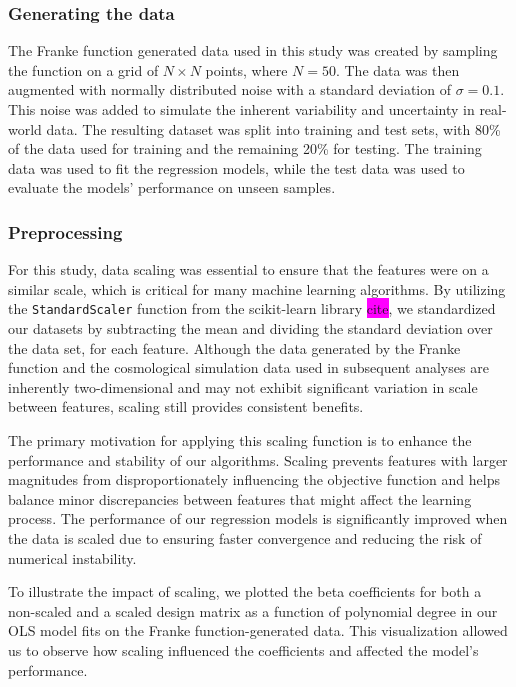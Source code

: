 \documentclass[aps,pra,english,notitlepage,reprint,nofootinbib]{revtex4-1}  %
\begin{document}
\subsubsection{Generating the data}
The Franke function generated data used in this study was created by sampling the function on a grid of $N\times N$ points, where $N=50$. The data was then augmented with normally distributed noise with a standard deviation of $\sigma=0.1$. This noise was added to simulate the inherent variability and uncertainty in real-world data. The resulting dataset was split into training and test sets, with 80\% of the data used for training and the remaining 20\% for testing. The training data was used to fit the regression models, while the test data was used to evaluate the models' performance on unseen samples.

\subsubsection{Preprocessing}
For this study, data scaling was essential to ensure that the features were on a similar scale, which is critical for many machine learning algorithms. By utilizing the \verb|StandardScaler| function from the scikit-learn library \colorbox{magenta}{cite}, we standardized our datasets by subtracting the mean and dividing the standard deviation over the data set, for each feature. Although the data generated by the Franke function and the cosmological simulation data used in subsequent analyses are inherently two-dimensional and may not exhibit significant variation in scale between features, scaling still provides consistent benefits.

The primary motivation for applying this scaling function is to enhance the performance and stability of our algorithms. Scaling prevents features with larger magnitudes from disproportionately influencing the objective function and helps balance minor discrepancies between features that might affect the learning process. The performance of our regression models is significantly improved when the data is scaled due to ensuring faster convergence and reducing the risk of numerical instability.

To illustrate the impact of scaling, we plotted the beta coefficients for both a non-scaled and a scaled design matrix as a function of polynomial degree in our OLS model fits on the Franke function-generated data. This visualization allowed us to observe how scaling influenced the coefficients and affected the model's performance.
\end{document}
